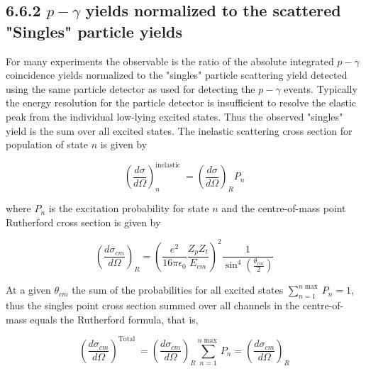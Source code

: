 \documentclass[10pt]{article}
\begin{document}
\subsection*{6.6.2 $p-\gamma$ yields normalized to the scattered "Singles" particle yields}
For many experiments the observable is the ratio of the absolute integrated $p-\gamma$ coincidence yields normalized to the "singles" particle scattering yield detected using the same particle detector as used for detecting the $p-\gamma$ events. Typically the energy resolution for the particle detector is insufficient to resolve the elastic peak from the individual low-lying excited states. Thus the observed "singles" yield is the sum over all excited states. The inelastic scattering cross section for population of state $n$ is given by

$$
\left(\frac{d \sigma}{d \Omega}\right)_{n}^{\text {inelastic }}=\left(\frac{d \sigma}{d \Omega}\right)_{R} P_{n}
$$

where $P_{n}$ is the excitation probability for state $n$ and the centre-of-mass point Rutherford cross section is given by


\begin{equation*}
\left(\frac{d \sigma_{c m}}{d \Omega}\right)_{R}=\left(\frac{e^{2}}{16 \pi \epsilon_{0}} \frac{Z_{p} Z_{t}}{E_{c m}}\right)^{2} \frac{1}{\sin ^{4}\left(\frac{\theta_{c m}}{2}\right)} \tag{4.5}
\end{equation*}


At a given $\theta_{c m}$ the sum of the probabilities for all excited states $\sum_{n=1}^{n \max } P_{n}=1$, thus the singles point cross section summed over all channels in the centre-of-mass equals the Rutherford formula, that is,


\begin{equation*}
\left(\frac{d \sigma_{c m}}{d \Omega}\right)^{\text {Total }}=\left(\frac{d \sigma_{c m}}{d \Omega}\right)_{R} \sum_{n=1}^{n \max } P_{n}=\left(\frac{d \sigma_{c m}}{d \Omega}\right)_{R} \tag{6.70}
\end{equation*}
\end{document}

